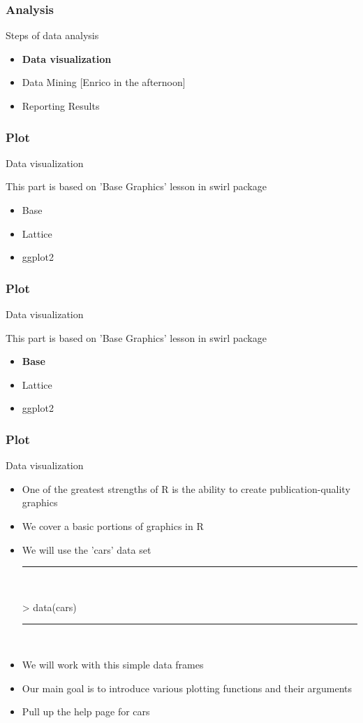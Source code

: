 \documentclass{beamer}
\begin{document}
\begin{frame}[fragile]
	\frametitle{Analysis}
	\centering \Large Steps of data analysis
	\begin{itemize}
		\small
		\item \textbf{Data visualization}
		\item Data Mining [Enrico in the afternoon]
		\item Reporting Results
	\end{itemize}
\end{frame}


\begin{frame}[fragile]
	\frametitle{Plot}
	\centering \Large Data visualization

	\centering \footnotesize This part is based on 'Base Graphics' lesson in swirl package
	\begin{itemize}
		\small
		\item Base
		\item Lattice
		\item ggplot2
	\end{itemize}
\end{frame}

\begin{frame}[fragile]
	\frametitle{Plot}
	\centering \Large Data visualization
	
	\centering \footnotesize This part is based on 'Base Graphics' lesson in swirl package
	\begin{itemize}
		\small
		\item \textbf{Base}
		\item Lattice
		\item ggplot2
	\end{itemize}
\end{frame}


\begin{frame}[fragile]
	\frametitle{Plot}
	\centering \Large Data visualization
	\begin{itemize}
		\small
		\item One of the greatest strengths of R is the ability to create publication-quality graphics
		\item We cover a basic portions of graphics in R
		\item We will use the 'cars' data set
\rule{\textwidth}{0.4pt}\\
\tiny
\setlength{\fancyvrbtopsep}{-1pt}
\setlength{\fancyvrbpartopsep}{-1pt}
\begin{Schunk}
\begin{Sinput}
> data(cars)
\end{Sinput}
\end{Schunk}
\rule{\textwidth}{0.4pt}\\
\small
		\item We will work with this simple data frames
		\item Our main goal is to introduce various plotting functions and their arguments
		\item Pull up the help page for cars
	\end{itemize}
\end{frame}
\end{document}
